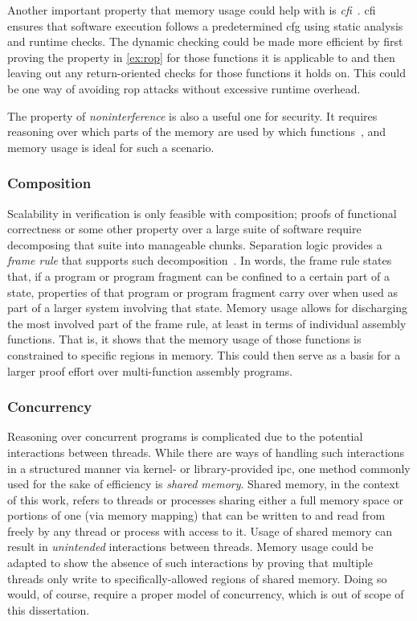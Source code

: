 Another important property that memory usage could help with
is \emph{\ac{cfi}}~\cite{abadi2009cfi}. \Ac{cfi} ensures that software execution
follows a predetermined \ac{cfg} using static analysis and runtime checks.
The dynamic checking could be made more efficient
by first proving the property in \cref{ex:rop} for those functions it is applicable to
and then leaving out any return-oriented checks for those functions it holds on.
This could be one way of avoiding \ac{rop} attacks without excessive runtime overhead.

The property of \emph{noninterference} is also a useful one for security.
It requires reasoning over which parts of the memory are used by which functions~\citep{rushby1992noninterference},
and memory usage is ideal for such a scenario.

\subsubsection{Composition}\label{sse:composition}
Scalability in verification is only feasible with composition;
proofs of functional correctness or some other property over a large suite of software
require decomposing that suite into manageable chunks.
Separation logic provides a \emph{frame rule} that supports such%
decomposition~\citep{o2001local,reynolds2002separation,krebbers2017essence}.
In words, the frame rule states that,
if a program or program fragment can be confined to a certain part of a state,
properties of that program or program fragment carry over
when used as part of a larger system involving that state.
Memory usage allows for discharging the most involved part of the frame rule,
at least in terms of individual assembly functions.
That is, it shows that the memory usage of those functions is constrained
to specific regions in memory.
This could then serve as a basis
for a larger proof effort over multi-function assembly programs.

\subsubsection{Concurrency}
Reasoning over concurrent programs is complicated
due to the potential interactions between threads.
While there are ways of handling such interactions in a structured manner
via kernel- or library-provided \ac{ipc},
one method commonly used for the sake of efficiency is \emph{shared memory}.
Shared memory, in the context of this work,
refers to threads or processes sharing either a full memory space
or portions of one (via memory mapping)
that can be written to and read from freely by any thread or process with access to it.
Usage of shared memory can result in \emph{unintended} interactions between threads.
Memory usage could be adapted to show the absence of such interactions
by proving that multiple threads only write
to specifically-allowed regions of shared memory.
Doing so would, of course, require a proper model of concurrency,
which is out of scope of this dissertation.


